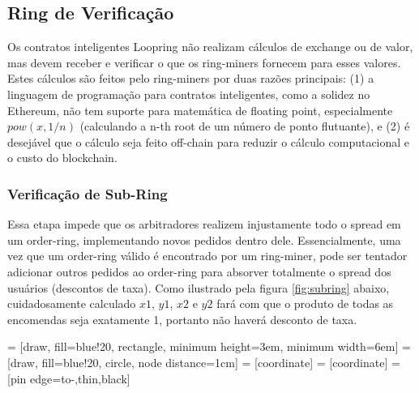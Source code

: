 \documentclass[UTF8,nofonts]{article}
\makeatletter
\newenvironment{figurehere}
 {\def\@captype{figure}}
 {}
\makeatother
\begin{document}
\begin{multicols}{2}
\subsection{Ring de Verificação\label{sec:ring_verification}}

Os contratos inteligentes Loopring não realizam cálculos de exchange ou de valor, mas devem receber e verificar o que os ring-miners fornecem para esses valores. Estes cálculos são feitos pelo ring-miners por duas razões principais: (1) a linguagem de programação para contratos inteligentes, como a solidez \cite{dannen2017introducing} no Ethereum, não tem suporte para matemática de floating point, especialmente $pow(x, 1/n)$ (calculando a n-th root de um número de ponto flutuante), e (2) é desejável que o cálculo seja feito off-chain para reduzir o cálculo computacional e o custo do blockchain.


\subsubsection{Verificação de Sub-Ring\label{sec:sub_ring_check}}

Essa etapa impede que os arbitradores realizem injustamente todo o spread em um order-ring, implementando novos pedidos dentro dele. Essencialmente, uma vez que um order-ring válido é encontrado por um ring-miner, pode ser tentador adicionar outros pedidos ao order-ring para absorver totalmente o spread dos usuários (descontos de taxa). Como ilustrado pela figura \ref{fig:subring} abaixo, cuidadosamente calculado $x1$, $y1$, $x2$ e $y2$ fará com que o produto de todas as encomendas seja exatamente 1, portanto não haverá desconto de taxa.

\begin{center}
\begin{figurehere}
\centering
{} = [draw, fill=blue!20, rectangle, 
    minimum height=3em, minimum width=6em]
 = [draw, fill=blue!20, circle, node distance=1cm]
 = [coordinate]
 = [coordinate]
 = [pin edge={to-,thin,black}]

\begin{tikzpicture}[
    auto, 
    node distance=2cm,
    >=latex',
    font=\bfseries\footnotesize\sffamily,
    order/.style={
		scale=0.7,
		rectangle,
		rounded corners,
		draw=black, 
		text centered,
		minimum height=12mm,
		fill=white
	},
	label/.style={
		scale=0.7
	}
  ]


\end{tikzpicture}
\end{figurehere}
\end{center}
\end{multicols}
\end{document}

